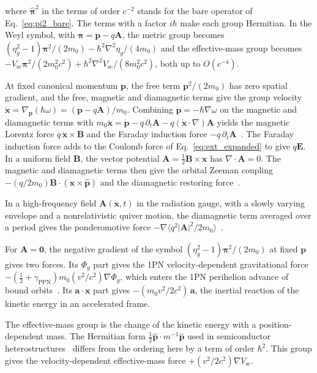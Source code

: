 \documentclass[aps,prd,onecolumn,tightenlines,nofootinbib,notitlepage,11pt,floatfix]{revtex4-2}
\theoremstyle{indentedtheorem}
\begin{document}
where $\hat{\boldsymbol{\pi}}^2$ in the terms of order $c^{-2}$ stands for the bare operator of Eq.~\eqref{eq:pi2_bare}. The terms with a factor $i\hbar$ make each group Hermitian. In the Weyl symbol, with $\boldsymbol{\pi}=\mathbf{p}-q\mathbf{A}$, the metric group becomes $(\eta_g^2-1)\boldsymbol{\pi}^2/(2m_0) - \hbar^2\nabla^2\eta_g/(4m_0)$ and the effective-mass group becomes $-V_\text{sc}\boldsymbol{\pi}^2/(2m_0^2c^2) + \hbar^2\nabla^2V_\text{sc}/(8m_0^2c^2)$, both up to $O(c^{-4})$.

At fixed canonical momentum $\mathbf{p}$, the free term $\mathbf{p}^2/(2m_0)$ has zero spatial gradient, and the free, magnetic and diamagnetic terms give the group velocity $\dot{\mathbf{x}} = \nabla_{\mathbf{p}}(\hbar\omega) = (\mathbf{p}-q\mathbf{A})/m_0$. Combining $\dot{\mathbf{p}}=-\hbar\nabla\omega$ on the magnetic and diamagnetic terms with $m_0\ddot{\mathbf{x}} = \dot{\mathbf{p}} - q\,\partial_t\mathbf{A} - q(\dot{\mathbf{x}}\cdot\nabla)\mathbf{A}$ yields the magnetic Lorentz force $q\,\dot{\mathbf{x}}\times\mathbf{B}$ and the Faraday induction force $-q\,\partial_t\mathbf{A}$~\citep{Lorentz1895Electrodynamics,Jackson1999Classical}. The Faraday induction force adds to the Coulomb force of Eq.~\eqref{eq:ext_expanded} to give $q\mathbf{E}$. In a uniform field $\mathbf{B}$, the vector potential $\mathbf{A}=\tfrac{1}{2}\mathbf{B}\times\mathbf{x}$ has $\nabla\cdot\mathbf{A}=0$. The magnetic and diamagnetic terms then give the orbital Zeeman coupling $-(q/2m_0)\mathbf{B}\cdot(\mathbf{x}\times\hat{\mathbf{p}})$ and the diamagnetic restoring force~\citep{Sakurai2020Modern}.

In a high-frequency field $\mathbf{A}(\mathbf{x},t)$ in the radiation gauge, with a slowly varying envelope and a nonrelativistic quiver motion, the diamagnetic term averaged over a period gives the ponderomotive force $-\nabla\langle q^2|\mathbf{A}|^2/2m_0\rangle$~\citep{Zhu2023Ionization}.

For $\mathbf{A}=\mathbf{0}$, the negative gradient of the symbol $(\eta_g^2-1)\boldsymbol{\pi}^2/(2m_0)$ at fixed $\mathbf{p}$ gives two forces. Its $\Phi_g$ part gives the 1PN velocity-dependent gravitational force $-(\tfrac{1}{2}+\gamma_\text{PPN})m_0(v^2/c^2)\nabla\Phi_g$, which enters the 1PN perihelion advance of bound orbits~\citep{Einstein1915GR,Will2014Confrontation}. Its $\mathbf{a}\cdot\mathbf{x}$ part gives $-(m_0v^2/2c^2)\,\mathbf{a}$, the inertial reaction of the kinetic energy in an accelerated frame.

The effective-mass group is the change of the kinetic energy with a position-dependent mass. The Hermitian form $\tfrac{1}{2}\hat{\mathbf{p}}\cdot m^{-1}\hat{\mathbf{p}}$ used in semiconductor heterostructures~\citep{BenDanielDuke1966Space} differs from the ordering here by a term of order $\hbar^2$. This group gives the velocity-dependent effective-mass force $+(v^2/2c^2)\nabla V_\text{sc}$.
\end{document}
